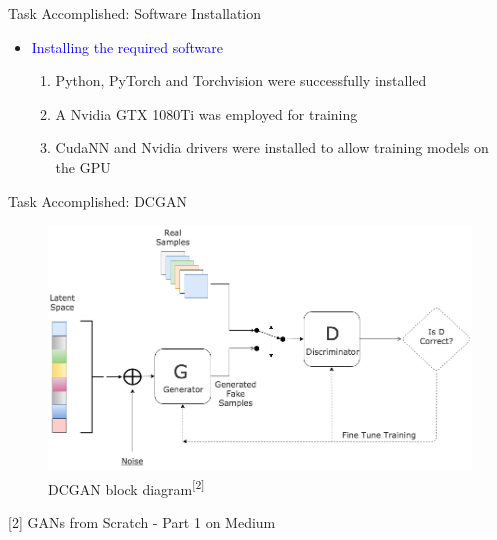 \documentclass[10pt, a4paper]{beamer}
\begin{document}
\begin{frame}{Task Accomplished: Software Installation}
	\begin{itemize}
\item {
\textcolor{blue}{Installing the required software}\linebreak 
\begin{enumerate}
    \item Python, PyTorch and Torchvision were successfully installed
    \item A Nvidia GTX 1080Ti was employed for training
    \item CudaNN and Nvidia drivers were installed to allow training models on the GPU
\end{enumerate}

}



	\end{itemize}
\end{frame}


\begin{frame}{Task Accomplished: DCGAN}
    \begin{figure}
  \includegraphics[width=\linewidth]{GAN.png}
  \caption{DCGAN block diagram\textsuperscript{[2]}}
  \label{fig:DCGAN}
\end{figure}
{\scriptsize{[2] GANs from Scratch - Part 1 on Medium}}

\end{frame}
\end{document}

